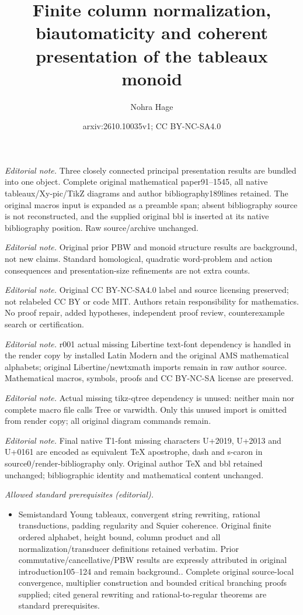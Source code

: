 \documentclass[a4paper, twoside, 11pt, english]{article}
\title{Finite column normalization, biautomaticity and coherent presentation of the tableaux monoid}
\author{Nohra Hage}
\date{arxiv:2610.10035v1; CC BY-NC-SA4.0}
\theoremstyle{plain}
\theoremstyle{definition}
\begin{document}
\maketitle
\noindent\textit{Editorial note.} Three closely connected principal presentation results are bundled into one object. Complete original mathematical paper91--1545, all native tableaux/Xy-pic/TikZ diagrams and author bibliography189lines retained. The original macros input is expanded as a preamble span; absent bibliography source is not reconstructed, and the supplied original bbl is inserted at its native bibliography position. Raw source/archive unchanged.\par\medskip
\noindent\textit{Editorial note.} Original prior PBW and monoid structure results are background, not new claims. Standard homological, quadratic word-problem and action consequences and presentation-size refinements are not extra counts.\par\medskip
\noindent\textit{Editorial note.} Original CC BY-NC-SA4.0 label and source licensing preserved; not relabeled CC BY or code MIT. Authors retain responsibility for mathematics. No proof repair, added hypotheses, independent proof review, counterexample search or certification.\par\medskip
\noindent\textit{Editorial note.} r001 actual missing Libertine text-font dependency is handled in the render copy by installed Latin Modern and the original AMS mathematical alphabets; original Libertine/newtxmath imports remain in raw author source. Mathematical macros, symbols, proofs and CC BY-NC-SA license are preserved.\par\medskip
\noindent\textit{Editorial note.} Actual missing tikz-qtree dependency is unused: neither main nor complete macro file calls Tree or varwidth. Only this unused import is omitted from render copy; all original diagram commands remain.\par\medskip
\noindent\textit{Editorial note.} Final native T1-font missing characters U+2019, U+2013 and U+0161 are encoded as equivalent TeX apostrophe, dash and s-caron in source0/render-bibliography only. Original author TeX and bbl retained unchanged; bibliographic identity and mathematical content unchanged.\par\medskip
\noindent\textit{Allowed standard prerequisites (editorial).}\begin{itemize}
\item Semistandard Young tableaux, convergent string rewriting, rational transductions, padding regularity and Squier coherence. Original finite ordered alphabet, height bound, column product and all normalization/transducer definitions retained verbatim. Prior commutative/cancellative/PBW results are expressly attributed in original introduction105--124 and remain background.. Complete original source-local convergence, multiplier construction and bounded critical branching proofs supplied; cited general rewriting and rational-to-regular theorems are standard prerequisites.
\end{itemize}\medskip
\end{document}
